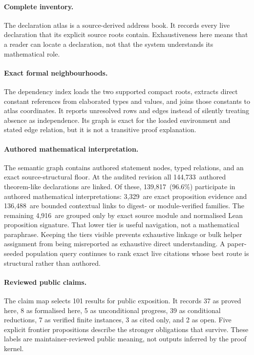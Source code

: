 \documentclass[11pt]{article}
\newcommand{\SemanticAuthoredTheoremLike}{144,733}
\newcommand{\SemanticAuthoredInterpreted}{139,817}
\newcommand{\SemanticDirectEvidence}{3,329}
\newcommand{\SemanticContextual}{136,488}
\newcommand{\SemanticStructuralOnly}{4,916}
\newcommand{\SemanticAuthoredPercent}{96.6}
\begin{document}
\paragraph{Complete inventory.}
The declaration atlas is a source-derived address book. It records every live
declaration that its explicit source roots contain. Exhaustiveness here means
that a reader can locate a declaration, not that the system understands its
mathematical role.

\paragraph{Exact formal neighbourhoods.}
The dependency index loads the two supported compact roots, extracts direct
constant references from elaborated types and values, and joins those
constants to atlas coordinates. It reports unresolved rows and edges instead
of silently treating absence as independence. Its graph is exact for the
loaded environment and stated edge relation, but it is not a transitive proof
explanation.

\paragraph{Authored mathematical interpretation.}
The semantic graph contains authored statement nodes, typed relations, and an
exact source-structural floor. At the audited revision all
\SemanticAuthoredTheoremLike\ authored theorem-like declarations are linked.
Of these, \SemanticAuthoredInterpreted\ (\SemanticAuthoredPercent\%) participate
in authored mathematical interpretations: \SemanticDirectEvidence\ are exact
proposition evidence and \SemanticContextual\ are bounded contextual links to
digest- or module-verified families. The remaining \SemanticStructuralOnly\ are grouped only by exact source
module and normalised Lean proposition signature. That lower tier is useful
navigation, not a mathematical paraphrase. Keeping the tiers visible prevents
exhaustive linkage or bulk helper assignment from being misreported as
exhaustive direct understanding. A paper-seeded population query continues to
rank exact live citations whose best route is structural rather than authored.

\paragraph{Reviewed public claims.}
The claim map selects 101 results for public exposition. It records 37 as
proved here, 8 as formalised here, 5 as unconditional progress, 39 as
conditional reductions, 7 as verified finite instances, 3 as cited only, and
2 as open. Five explicit frontier propositions describe the stronger
obligations that survive. These labels are maintainer-reviewed public meaning,
not outputs inferred by the proof kernel.
\end{document}
